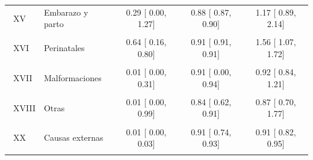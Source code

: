 \begin{tabular}{l l c c c}
\ XV & Embarazo y parto &  0.29 [ 0.00, 1.27] &  0.88 [ 0.87, 0.90] &  1.17 [ 0.89, 2.14] \\
\\
\ XVI & Perinatales &  0.64 [ 0.16, 0.80] &  0.91 [ 0.91, 0.91] &  1.56 [ 1.07, 1.72] \\
\\
\ XVII & Malformaciones &  0.01 [ 0.00, 0.31] &  0.91 [ 0.00, 0.94] &  0.92 [ 0.84, 1.21] \\
\\
\ XVIII & Otras & 0.01 [ 0.00, 0.99] &  0.84 [ 0.62, 0.91] &  0.87 [ 0.70, 1.77] \\
\\
\ XX & Causas externas &  0.01 [ 0.00, 0.03] &  0.91 [ 0.74, 0.93] &  0.91 [ 0.82, 0.95] \\
\\
\midrule[1 pt]
\end{tabular}
